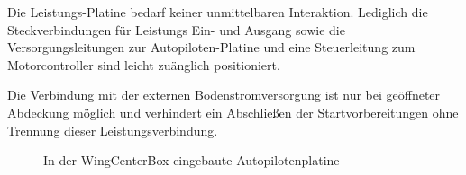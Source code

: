 Die Leistungs-Platine bedarf keiner unmittelbaren Interaktion. Lediglich die Steckverbindungen für Leistungs Ein- und Ausgang sowie die Versorgungsleitungen zur Autopiloten-Platine und eine Steuerleitung zum Motorcontroller sind leicht zuänglich positioniert.

Die Verbindung mit der externen Bodenstromversorgung ist nur bei geöffneter Abdeckung möglich und verhindert ein Abschließen der Startvorbereitungen ohne Trennung dieser Leistungsverbindung.

\begin{figure}[H]
\centering
{}
\caption{In der WingCenterBox eingebaute Autopilotenplatine} 
\label{fig:In der WingCenterBox eingebaute Autopilotenplatine}
\end{figure}